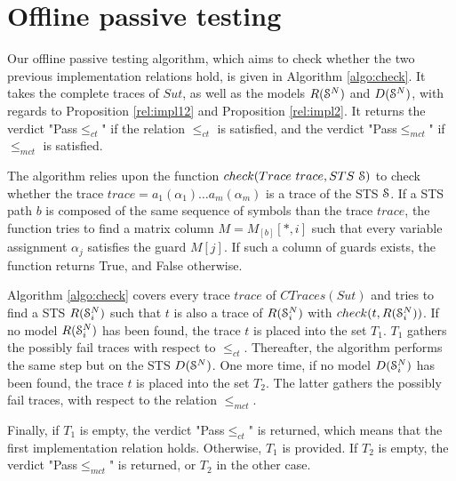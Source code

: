 \section{Offline passive testing}
\label{sec:testing:offline}

Our offline passive testing algorithm, which aims to check
whether the two previous implementation relations hold, is given
in Algorithm \ref{algo:check}. It takes the complete traces of
$\mathit{Sut}$, as well as the models $R(\EuScript{S}^{N})$ and
$D(\EuScript{S}^{N})$, with regards to Proposition
\ref{rel:impl12} and Proposition \ref{rel:impl2}. It returns the
verdict "Pass$\leq_{ct}$" if the relation $\leq_{ct}$ is
satisfied, and the verdict "Pass$\leq_{mct}$" if $\leq_{mct}$ is
satisfied.

The algorithm relies upon the function ${check(Trace ~trace, STS
~\EuScript{S})}$ to check whether the trace $trace =
a_1(\alpha_1) \dots a_m(\alpha_m)$ is a trace of the STS
$\EuScript{S}$. If a STS path $b$ is composed of the same
sequence of symbols than the trace $trace$, the function tries to
find a matrix column $M=M_{[b]}[*,i]$ such that every variable
assignment $\alpha_j$ satisfies the guard $M[j]$. If such a
column of guards exists, the function returns True, and False
otherwise.

Algorithm \ref{algo:check} covers every trace $trace$ of
$CTraces({Sut})$ and tries to find a STS $R(\EuScript{S}_i^{N})$
such that $t$ is also a trace of $R(\EuScript{S}_i^{N})$ with
$check(t, R(\EuScript{S}_i^{N}))$.  If no model
$R(\EuScript{S}_i^{N})$ has been found, the trace $t$ is placed
into the set $T_1$. $T_1$ gathers the possibly fail traces
with respect to $\leq_{ct}$. Thereafter, the algorithm performs the same
step but on the STS $D(\EuScript{S}^{N})$. One more time, if no
model $D(\EuScript{S}_i^{N})$ has been found, the trace $t$ is placed
into the set $T_2$.  The latter gathers the possibly fail traces,
with respect to the relation $\leq_{mct}$.

Finally, if $T_1$ is empty, the verdict "Pass$\leq_{ct}$" is
returned, which means that the first implementation relation holds.
Otherwise, $T_1$ is provided. If $T_2$ is empty, the verdict
"Pass$\leq_{mct}$" is returned, or $T_2$ in the other case.


